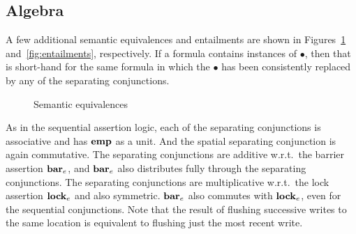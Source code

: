 \documentclass[11pt]{report}
\begin{document}
\subsection{Algebra}
\label{sec:algebra}

A few additional semantic equivalences and entailments are shown in Figures~\ref{fig:equivalences} and~\ref{fig:entailments}, respectively. If a formula contains instances of $\bullet$, then that is short-hand for the same formula in which the $\bullet$ has been consistently replaced by any of the separating conjunctions. 

\begin{figure}[ht]
	\centering
	\caption{\label{fig:equivalences}Semantic equivalences}
\end{figure}

As in the sequential assertion logic, each of the separating conjunctions is associative and has $\mathbf{emp}$ as a unit. And the spatial separating conjunction is again commutative. The separating conjunctions are additive w.r.t.\ the barrier assertion $\mathbf{bar}_{e}$, and $\mathbf{bar}_{e}$ also distributes fully through the separating conjunctions. The separating conjunctions are multiplicative w.r.t.\ the lock assertion $\mathbf{lock}_{e}$ and also symmetric. $\mathbf{bar}_{e}$ also commutes with $\mathbf{lock}_{e}$, even for the sequential conjunctions. Note that the result of flushing successive writes to the same location is equivalent to flushing just the most recent write. 
\end{document}
